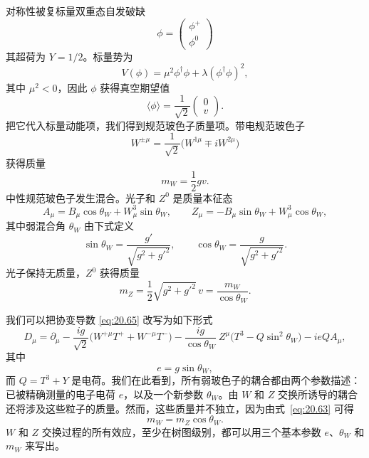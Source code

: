 对称性被复标量双重态自发破缺
\begin{equation}
  \phi = \begin{pmatrix}\phi^+\\ \phi^0\end{pmatrix}
\end{equation}
其超荷为 $Y = 1/2$。标量势为
\begin{equation}
  V(\phi) = \mu^2\phi^{\dagger}\phi + \lambda(\phi^{\dagger}\phi)^2 ,
\end{equation}
其中 $\mu^2 < 0$，因此 $\phi$ 获得真空期望值
\begin{equation}
  \langle\phi\rangle = \frac{1}{\sqrt{2}}\begin{pmatrix}0\\ v\end{pmatrix} .
  \label{eq:20.58b}
\end{equation}
把它代入标量动能项，我们得到规范玻色子质量项。带电规范玻色子
\begin{equation}
  W^{\pm\mu} = \frac{1}{\sqrt{2}}\bigl( W^{1\mu} \mp iW^{2\mu} \bigr)
  \label{eq:20.63}
\end{equation}
获得质量
\begin{equation}
  m_W = \frac{1}{2}gv .
\end{equation}
中性规范玻色子发生混合。光子和 $Z^0$ 是质量本征态
\begin{equation}
  A_\mu = B_\mu\cos\theta_W + W^3_\mu\sin\theta_W,\qquad
  Z_\mu = -B_\mu\sin\theta_W + W^3_\mu\cos\theta_W ,
  \label{eq:20.64}
\end{equation}
其中弱混合角 $\theta_W$ 由下式定义
\begin{equation}
  \sin\theta_W = \frac{g'}{\sqrt{g^2+g'^2}},\qquad
  \cos\theta_W = \frac{g}{\sqrt{g^2+g'^2}} .
\end{equation}
光子保持无质量，$Z^0$ 获得质量
\begin{equation}
  m_Z = \frac{1}{2}\sqrt{g^2+g'^2}\,v = \frac{m_W}{\cos\theta_W} .
  \label{eq:20.73}
\end{equation}

我们可以把协变导数 \eqref{eq:20.65} 改写为如下形式
\begin{equation}
  D_\mu = \partial_\mu - \frac{ig}{\sqrt{2}}\bigl( W^{+\mu}T^+ + W^{-\mu}T^-
    \bigr) - \frac{ig}{\cos\theta_W}\ Z^\mu\bigl( T^3 - Q\sin^2\theta_W
      \bigr) - ieQA_\mu ,
  \label{eq:20.71}
\end{equation}
其中
\begin{equation}
  e = g\sin\theta_W ,
  \label{eq:20.72}
\end{equation}
而 $Q = T^3 + Y$ 是电荷。我们在此看到，所有弱玻色子的耦合都由两个参数描述：已被精确测量的电子电荷 $e$，以及一个新参数 $\theta_W$。由 $W$ 和 $Z$ 交换所诱导的耦合还将涉及这些粒子的质量。然而，这些质量并不独立，因为由式~\eqref{eq:20.63} 可得
\begin{equation}
  m_W = m_Z\cos\theta_W .
  \label{eq:20.73b}
\end{equation}
$W$ 和 $Z$ 交换过程的所有效应，至少在树图级别，都可以用三个基本参数 $e$、$\theta_W$ 和 $m_W$ 来写出。

